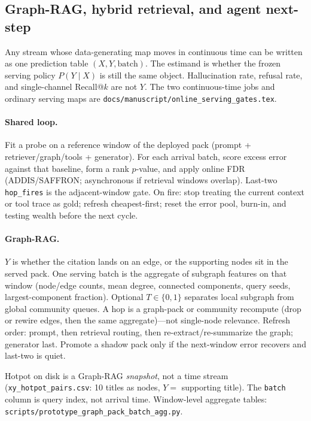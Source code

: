 \subsection{Graph-RAG, hybrid retrieval, and agent next-step}
\label{sec:usecase-rag-agent}
Any stream whose data-generating map moves in continuous time can be written as one prediction table
\((X,Y,\mathrm{batch})\).
The estimand is whether the frozen serving policy \(P(Y\mid X)\) is still the same object.
Hallucination rate, refusal rate, and single-channel Recall@\(k\) are not \(Y\).
The two continuous-time jobs and ordinary serving maps are \texttt{docs/manuscript/online\_serving\_gates.tex}.

\paragraph{Shared loop.}
Fit a probe on a reference window of the deployed pack (prompt + retriever/graph/tools + generator).
For each arrival batch, score excess error against that baseline, form a rank \(p\)-value, and apply online FDR
(ADDIS/SAFFRON; asynchronous if retrieval windows overlap).
Last-two \texttt{hop\_fires} is the adjacent-window gate.
On fire: stop treating the current context or tool trace as gold; refresh cheapest-first; reset the error pool,
burn-in, and testing wealth before the next cycle.

\paragraph{Graph-RAG.}
\(Y\) is whether the citation lands on an edge, or the supporting nodes sit in the served pack.
One serving batch is the aggregate of subgraph features on that window
(node/edge counts, mean degree, connected components, query seeds, largest-component fraction).
Optional \(T\in\{0,1\}\) separates local subgraph from global community queues.
A hop is a graph-pack or community recompute (drop or rewire edges, then the same aggregate)---not single-node relevance.
Refresh order: prompt, then retrieval routing, then re-extract/re-summarize the graph; generator last.
Promote a shadow pack only if the next-window error recovers and last-two is quiet.

Hotpot on disk is a Graph-RAG \emph{snapshot}, not a time stream
(\texttt{xy\_hotpot\_pairs.csv}: 10 titles as nodes, \(Y=\) supporting title).
The \texttt{batch} column is query index, not arrival time.
Window-level aggregate tables: \texttt{scripts/prototype\_graph\_pack\_batch\_agg.py}.

